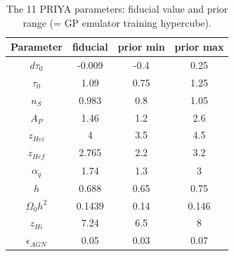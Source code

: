 \begin{table}[!h]
\caption{\label{tab:params} The 11 PRIYA parameters: fiducial value and prior range (= GP emulator training hypercube).}
\begin{ruledtabular}\centering
\begin{tabular}{c|ccc}
Parameter & fiducial & prior min & prior max \\
\hline
$d\tau_0$ & -0.009 & -0.4 & 0.25 \\
$\tau_0$ & 1.09 & 0.75 & 1.25 \\
$n_S$ & 0.983 & 0.8 & 1.05 \\
$A_P$ & 1.46 & 1.2 & 2.6 \\
$z_{Hei}$ & 4 & 3.5 & 4.5 \\
$z_{Hef}$ & 2.765 & 2.2 & 3.2 \\
$\alpha_q$ & 1.74 & 1.3 & 3 \\
$h$ & 0.688 & 0.65 & 0.75 \\
$\Omega_0 h^2$ & 0.1439 & 0.14 & 0.146 \\
$z_{Hi}$ & 7.24 & 6.5 & 8 \\
$\epsilon_{AGN}$ & 0.05 & 0.03 & 0.07 \\
\end{tabular}\end{ruledtabular}\end{table}
